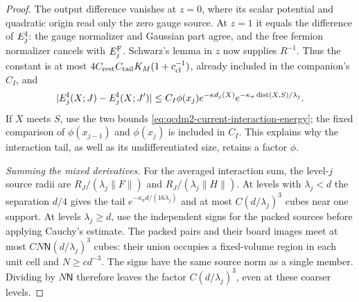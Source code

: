 \documentclass[11pt,letterpaper,reqno]{amsart}
\theoremstyle{definition}
\theoremstyle{remark}
\begin{document}
\begin{proof}
The output difference vanishes at $z=0$, where its scalar
potential and quadratic origin read only the zero gauge
source. At $z=1$ it equals the difference of $E_j^{\rm I}$:
the gauge normalizer and Gaussian part agree, and the free
fermion normalizer cancels with $E_j^{\rm F}$. Schwarz's
lemma in $z$ now supplies $R^{-1}$. Thus the constant is
at most $4C_{\rm rest}C_{\rm tail}K_M(1+c_{\rm cl}^{-1})$,
already included in the companion's $C_I$, and
\begin{equation}\label{eq:qcdm2-current-interaction-tail}
 |E_j^{\rm I}(X;J)-E_j^{\rm I}(X;J')|
 \le C_I\phi(x_j)e^{-\kappa d_j(X)}
       e^{-\kappa_\sigma\operatorname{dist}(X,S)/\lambda_j}.
\end{equation}
If $X$ meets $S$, use the two bounds
\eqref{eq:qcdm2-current-interaction-energy}; the fixed
comparison of $\phi(x_{j-1})$ and $\phi(x_j)$ is included
in $C_I$. This explains why the interaction tail, as
well as its undifferentiated size, retains a factor
$\phi$.

\emph{Summing the mixed derivatives.}
For the averaged interaction sum, the level-$j$ source
radii are $R_J/(\lambda_j\|F\|)$ and
$R_J/(\lambda_j\|H\|)$.  At levels with $\lambda_j<d$
the separation $d/4$ gives the tail
$e^{-\kappa_\sigma d/(16\lambda_j)}$ and at most
$C(d/\lambda_j)^3$ cubes near one support.
At levels $\lambda_j\ge d$, use the independent signs
for the packed sources before applying Cauchy's
estimate. The packed pairs and their board images
meet at most $CN\mathsf N(d/\lambda_j)^3$ cubes:
their union occupies a fixed-volume region in each
unit cell and $N\ge c d^{-3}$. The signs have the
same source norm as a single member. Dividing by
$N\mathsf N$ therefore leaves the factor
$C(d/\lambda_j)^3$, even at these coarser levels.


\end{proof}
\end{document}
